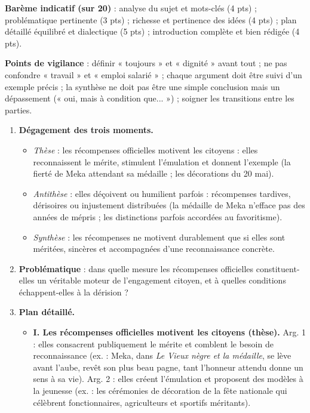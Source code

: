 \documentclass[11pt]{article}
\begin{document}
\begin{corrige}
\textbf{Barème indicatif (sur 20)} : analyse du sujet et mots-clés (4 pts) ; problématique pertinente (3 pts) ; richesse et pertinence des idées (4 pts) ; plan détaillé équilibré et dialectique (5 pts) ; introduction complète et bien rédigée (4 pts).

\textbf{Points de vigilance} : définir « toujours » et « dignité » avant tout ; ne pas confondre « travail » et « emploi salarié » ; chaque argument doit être suivi d'un exemple précis ; la synthèse ne doit pas être une simple conclusion mais un dépassement (« oui, mais à condition que... ») ; soigner les transitions entre les parties.
\end{corrige}

\begin{corrige}
\begin{enumerate}
\item \textbf{Dégagement des trois moments.}
\begin{itemize}
\item \emph{Thèse} : les récompenses officielles motivent les citoyens : elles reconnaissent le mérite, stimulent l'émulation et donnent l'exemple (la fierté de Meka attendant sa médaille ; les décorations du 20 mai).
\item \emph{Antithèse} : elles déçoivent ou humilient parfois : récompenses tardives, dérisoires ou injustement distribuées (la médaille de Meka n'efface pas des années de mépris ; les distinctions parfois accordées au favoritisme).
\item \emph{Synthèse} : les récompenses ne motivent durablement que si elles sont méritées, sincères et accompagnées d'une reconnaissance concrète.
\end{itemize}
\item \textbf{Problématique} : dans quelle mesure les récompenses officielles constituent-elles un véritable moteur de l'engagement citoyen, et à quelles conditions échappent-elles à la dérision ?
\item \textbf{Plan détaillé.}
\begin{itemize}
\item \textbf{I. Les récompenses officielles motivent les citoyens (thèse).} Arg. 1 : elles consacrent publiquement le mérite et comblent le besoin de reconnaissance (ex. : Meka, dans \emph{Le Vieux nègre et la médaille}, se lève avant l'aube, revêt son plus beau pagne, tant l'honneur attendu donne un sens à sa vie). Arg. 2 : elles créent l'émulation et proposent des modèles à la jeunesse (ex. : les cérémonies de décoration de la fête nationale qui célèbrent fonctionnaires, agriculteurs et sportifs méritants).

\end{itemize}
\end{enumerate}
\end{corrige}
\end{document}

